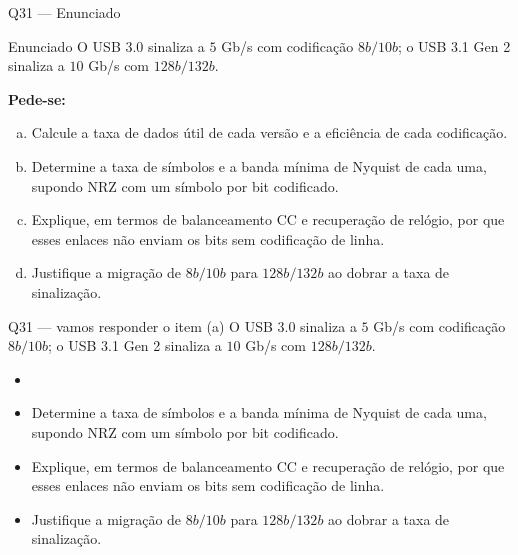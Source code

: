 \documentclass[aspectratio=169]{beamer}
\begin{document}
\begin{frame}[allowframebreaks]{Q31 --- Enunciado}
  \small
  \begin{block}{Enunciado}
  O USB 3.0 sinaliza a $5$ Gb/s com codificação $8b/10b$; o USB 3.1 Gen 2 sinaliza a $10$ Gb/s com $128b/132b$.
  \end{block}
  \vspace{0.1cm}
  \textbf{Pede-se:}
  \begin{enumerate}[(a)]
    \item Calcule a taxa de dados útil de cada versão e a eficiência de cada codificação.
    \item Determine a taxa de símbolos e a banda mínima de Nyquist de cada uma, supondo NRZ com um símbolo por bit codificado.
    \item Explique, em termos de balanceamento CC e recuperação de relógio, por que esses enlaces não enviam os bits sem codificação de linha.
    \item Justifique a migração de $8b/10b$ para $128b/132b$ ao dobrar a taxa de sinalização.
  \end{enumerate}
\end{frame}

\begin{frame}{Q31 --- vamos responder o item (a)}
  \small
  \textcolor{gray!55}{O USB 3.0 sinaliza a $5$ Gb/s com codificação $8b/10b$; o USB 3.1 Gen 2 sinaliza a $10$ Gb/s com $128b/132b$.}
  \vspace{0.35cm}
  \begin{itemize}
    \item[\textcolor{unbprimary}{(a)}] 
    \item[\textcolor{gray!55}{(b)}] \textcolor{gray!55}{Determine a taxa de símbolos e a banda mínima de Nyquist de cada uma, supondo NRZ com um símbolo por bit codificado.}
    \item[\textcolor{gray!55}{(c)}] \textcolor{gray!55}{Explique, em termos de balanceamento CC e recuperação de relógio, por que esses enlaces não enviam os bits sem codificação de linha.}
    \item[\textcolor{gray!55}{(d)}] \textcolor{gray!55}{Justifique a migração de $8b/10b$ para $128b/132b$ ao dobrar a taxa de sinalização.}
  \end{itemize}
\end{frame}
\end{document}
